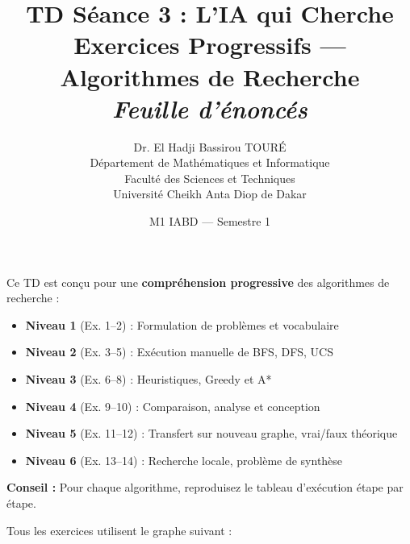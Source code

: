 \documentclass[11pt,a4paper]{article}
\title{\textbf{TD Séance 3 : L'IA qui Cherche}\\
\large Exercices Progressifs --- Algorithmes de Recherche\\[0.3cm]
\normalsize \textit{Feuille d'énoncés}}
\author{Dr. El Hadji Bassirou TOURÉ\\
Département de Mathématiques et Informatique\\
Faculté des Sciences et Techniques\\
Université Cheikh Anta Diop de Dakar}
\date{M1 IABD --- Semestre 1}
\begin{document}
\maketitle

\begin{rappelbox}[Organisation de ce TD]
Ce TD est conçu pour une \textbf{compréhension progressive} des algorithmes de recherche :

\begin{itemize}[nosep]
    \item \textbf{Niveau 1} (Ex. 1--2) : Formulation de problèmes et vocabulaire
    \item \textbf{Niveau 2} (Ex. 3--5) : Exécution manuelle de BFS, DFS, UCS
    \item \textbf{Niveau 3} (Ex. 6--8) : Heuristiques, Greedy et A*
    \item \textbf{Niveau 4} (Ex. 9--10) : Comparaison, analyse et conception
    \item \textbf{Niveau 5} (Ex. 11--12) : Transfert sur nouveau graphe, vrai/faux théorique
    \item \textbf{Niveau 6} (Ex. 13--14) : Recherche locale, problème de synthèse
\end{itemize}

\textbf{Conseil :} Pour chaque algorithme, reproduisez le tableau d'exécution étape par étape.
\end{rappelbox}

\vspace{0.3cm}

Tous les exercices utilisent le graphe suivant :

\begin{center}
\end{center}
\end{document}
